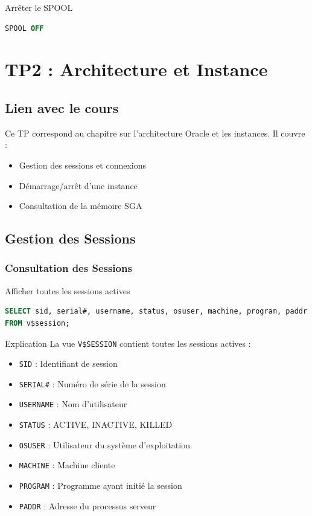 \documentclass[12pt,a4paper]{article}
\begin{document}
\begin{commande}{Arrêter le SPOOL}
\begin{lstlisting}[language=SQL]
SPOOL OFF
\end{lstlisting}
\end{commande}

\section{TP2 : Architecture et Instance}

\subsection{Lien avec le cours}

Ce TP correspond au chapitre sur l'architecture Oracle et les instances. Il couvre :
\begin{itemize}
    \item Gestion des sessions et connexions
    \item Démarrage/arrêt d'une instance
    \item Consultation de la mémoire SGA
\end{itemize}

\subsection{Gestion des Sessions}

\subsubsection{Consultation des Sessions}

\begin{commande}{Afficher toutes les sessions actives}
\begin{lstlisting}[language=SQL]
SELECT sid, serial#, username, status, osuser, machine, program, paddr
FROM v$session;
\end{lstlisting}
\end{commande}

\begin{explication}{Explication}
La vue \texttt{V\$SESSION} contient toutes les sessions actives :
\begin{itemize}
    \item \texttt{SID} : Identifiant de session
    \item \texttt{SERIAL\#} : Numéro de série de la session
    \item \texttt{USERNAME} : Nom d'utilisateur
    \item \texttt{STATUS} : ACTIVE, INACTIVE, KILLED
    \item \texttt{OSUSER} : Utilisateur du système d'exploitation
    \item \texttt{MACHINE} : Machine cliente
    \item \texttt{PROGRAM} : Programme ayant initié la session
    \item \texttt{PADDR} : Adresse du processus serveur
\end{itemize}
\end{explication}
\end{document}
